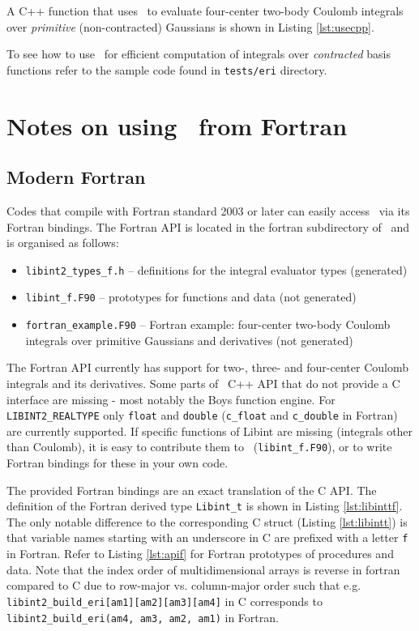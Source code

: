 \documentclass[10pt]{article}
\begin{document}
A C++ function that uses \LIBINT\ to evaluate four-center two-body Coulomb
integrals over {\em primitive} (non-contracted) Gaussians is shown in Listing
\ref{lst:usecpp}.



To see how to use \LIBINT\ for efficient computation of integrals over
{\em contracted} basis functions refer to the sample code found in
{\tt tests/eri} directory.

\section{Notes on using \LIBINT\ from Fortran \label{ssec:fort} }

\subsection{Modern Fortran}

Codes that compile with Fortran standard 2003 or later can easily access \LIBINT\ via its Fortran bindings.
The Fortran API is located in the fortran subdirectory of \LIBINT\ and is organised as follows:
\begin{itemize}
    \item {\tt libint2\_types\_f.h} -- definitions for the integral evaluator types (generated)
    \item {\tt libint\_f.F90} -- prototypes for functions and data (not generated)
    \item {\tt fortran\_example.F90} -- Fortran example: four-center two-body Coulomb integrals over primitive Gaussians and derivatives (not generated)
\end{itemize}

The Fortran API currently has support for two-, three- and four-center Coulomb integrals and its derivatives.
Some parts of \LIBINT\ C++ API that do not provide a C interface are missing - most notably the Boys function engine.
For {\tt LIBINT2\_REALTYPE} only {\tt float} and {\tt double} ({\tt c\_float} and {\tt c\_double} in Fortran) are currently supported.
If specific functions of Libint are missing (integrals other than Coulomb), it is easy to contribute them to \LIBINT\ ({\tt libint\_f.F90}),
or to write Fortran bindings for these in your own code.

The provided Fortran bindings are an exact translation of the C API.
The definition of the Fortran derived type {\tt Libint\_t} is shown in Listing \ref{lst:libinttf}.
The only notable difference to the corresponding C struct (Listing \ref{lst:libintt}) is that variable names starting with an underscore in C are prefixed with a letter {\tt f} in Fortran.
Refer to Listing \ref{lst:apif} for Fortran prototypes of procedures and data.
Note that the index order of multidimensional arrays is reverse in fortran
compared to C due to row-major vs. column-major order such that e.g. {\tt
libint2\_build\_eri[am1][am2][am3][am4]} in C corresponds to {\tt
libint2\_build\_eri(am4, am3, am2, am1)} in Fortran.
\end{document}

